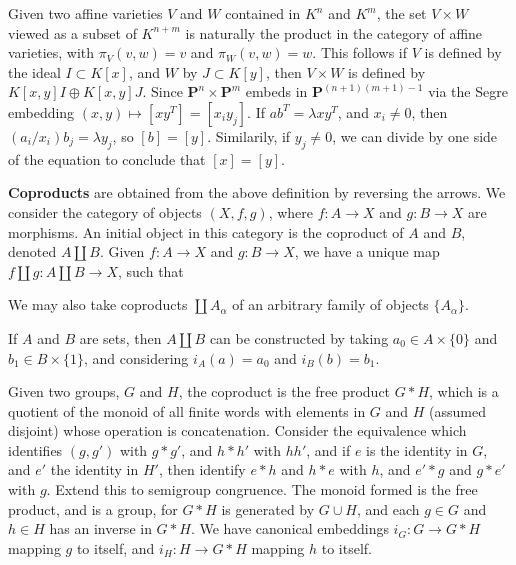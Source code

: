 \begin{example}
    Given two affine varieties $V$ and $W$ contained in $K^n$ and $K^m$, the set $V \times W$ viewed as a subset of $K^{n+m}$ is naturally the product in the category of affine varieties, with $\pi_V(v,w) = v$ and $\pi_W(v,w) = w$. This follows if $V$ is defined by the ideal $I \subset K[x]$, and $W$ by $J \subset K[y]$, then $V \times W$ is defined by $K[x,y] I \oplus K[x,y] J$. Since $\mathbf{P}^n \times \mathbf{P}^m$ embeds in $\mathbf{P}^{(n+1)(m+1) - 1}$ via the Segre embedding $(x,y) \mapsto [x y^T] = [x_i y_j]$. If $ab^T = \lambda xy^T$, and $x_i \neq 0$, then $(a_i/x_i) b_j = \lambda y_j$, so $[b] = [y]$. Similarily, if $y_j \neq 0$, we can divide by one side of the equation to conclude that $[x] = [y]$.
\end{example}

{\bf Coproducts} are obtained from the above definition by reversing the arrows. We consider the category of objects $(X,f,g)$, where $f: A \to X$ and $g: B \to X$ are morphisms. An initial object in this category is the coproduct of $A$ and $B$, denoted $A \amalg B$. Given $f: A \to X$ and $g: B \to X$, we have a unique map $f \amalg g: A \amalg B \to X$, such that
%
\begin{center}
\end{center}
%
We may also take coproducts $\coprod A_\alpha$ of an arbitrary family of objects $\{ A_\alpha \}$.

\begin{example}
    If $A$ and $B$ are sets, then $A \amalg B$ can be constructed by taking $a_0 \in A \times \{ 0 \}$ and $b_1 \in B \times \{ 1 \}$, and considering $i_A(a) = a_0$ and $i_B(b) = b_1$. 
\end{example}

\begin{example}
    Given two groups, $G$ and $H$, the coproduct is the free product $G * H$, which is a quotient of the monoid of all finite words with elements in $G$ and $H$ (assumed disjoint) whose operation is concatenation. Consider the equivalence which identifies $(g,g')$ with $g * g'$, and $h * h'$ with $hh'$, and if $e$ is the identity in $G$, and $e'$ the identity in $H'$, then identify $e * h$ and $h * e$ with $h$, and $e' * g$ and $g * e'$ with $g$. Extend this to semigroup congruence. The monoid formed is the free product, and is a group, for $G * H$ is generated by $G \cup H$, and each $g \in G$ and $h \in H$ has an inverse in $G * H$. We have canonical embeddings $i_G: G \to G * H$ mapping $g$ to itself, and $i_H: H \to G * H$ mapping $h$ to itself.
\end{example}


